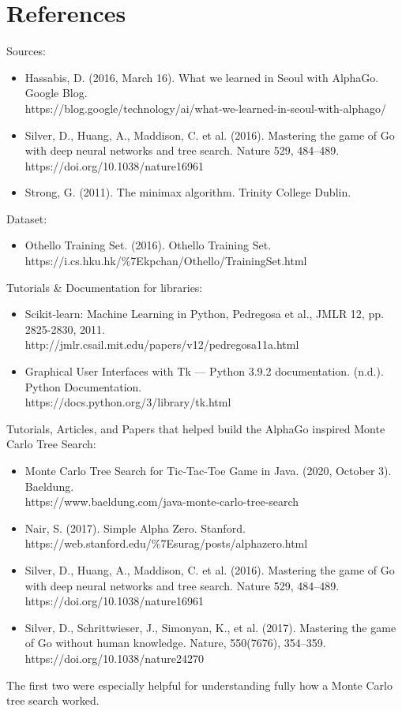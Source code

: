 \documentclass[fontsize=11pt]{article}
\begin{document}
\section*{References}

Sources:
\begin{itemize}
    \item Hassabis, D. (2016, March 16). What we learned in Seoul with AlphaGo. Google Blog. \\https://blog.google/technology/ai/what-we-learned-in-seoul-with-alphago/
    \item Silver, D., Huang, A., Maddison, C. et al. (2016). Mastering the game of Go with deep neural networks and tree search. Nature 529, 484–489. \\https://doi.org/10.1038/nature16961
    \item Strong, G. (2011). The minimax algorithm. Trinity College Dublin.
\end{itemize}
Dataset:
\begin{itemize}
    \item Othello Training Set. (2016). Othello Training Set. \\https://i.cs.hku.hk/\%7Ekpchan/Othello/TrainingSet.html
\end{itemize}
Tutorials \& Documentation for libraries:
\begin{itemize}
    \item Scikit-learn: Machine Learning in Python, Pedregosa et al., JMLR 12, pp. 2825-2830, 2011. \\http://jmlr.csail.mit.edu/papers/v12/pedregosa11a.html
    \item Graphical User Interfaces with Tk — Python 3.9.2 documentation. (n.d.). Python Documentation. \\https://docs.python.org/3/library/tk.html
\end{itemize}
Tutorials, Articles, and Papers that helped build the AlphaGo inspired Monte Carlo Tree Search:
\begin{itemize}
    \item Monte Carlo Tree Search for Tic-Tac-Toe Game in Java. (2020, October 3). Baeldung. \\https://www.baeldung.com/java-monte-carlo-tree-search
    \item Nair, S. (2017). Simple Alpha Zero. Stanford. \\https://web.stanford.edu/\%7Esurag/posts/alphazero.html
    \item Silver, D., Huang, A., Maddison, C. et al. (2016). Mastering the game of Go with deep neural networks and tree search. Nature 529, 484–489. \\https://doi.org/10.1038/nature16961
    \item Silver, D., Schrittwieser, J., Simonyan, K., et al. (2017). Mastering the game of Go without human knowledge. Nature, 550(7676), 354–359. \\https://doi.org/10.1038/nature24270
\end{itemize}
The first two were especially helpful for understanding fully how a Monte Carlo tree search worked.
\end{document}
